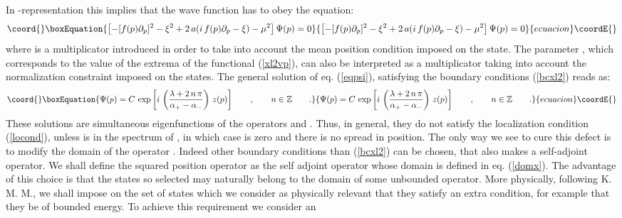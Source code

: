 \documentclass[a4paper,10pt]{article}
\providecommand{\x}{\mbox{\rm{\bf \^ x}}}
\providecommand{\xl}{\x_{\lambda}}
\providecommand{\cD}{{\cal D}}
\providecommand{\ZZ}{\mathbb Z}
\begin{document}
In \coordHE{}-representation this implies that the wave function
\coordHE{} has to obey the equation:
\begin{equation}\coord{}\boxEquation{
\left[-[f(p)\partial_p]^2-\xi^2+2\,a(i\,f(p)\partial_p-\xi)-\mu^2\right]\Psi(p)=0\label{eqpsi}
}{
\left[-[f(p)\partial_p]^2-\xi^2+2\,a(i\,f(p)\partial_p-\xi)-\mu^2\right]\Psi(p)=0}{ecuacion}\coordE{}\end{equation} where \coordHE{} is a multiplicator introduced in order to
take into account the mean position condition imposed on the
state. The parameter \coordHE{}, which corresponds to the value of
the extrema of the functional (\ref{xl2vp}), can also be
interpreted as a multiplicator taking into account the
normalization constraint imposed on the states. The general
solution of eq. (\ref{eqpsi}), satisfying the boundary conditions
(\ref{bcxl2}) reads as:
\begin{equation}\coord{}\boxEquation{
\Psi(p)=C\,\exp\left[i\,\left(\frac{\lambda+2\,n\,\pi}{\alpha_+-\alpha_-}\right)
\,z(p)\right] \qquad,\qquad n\in\ZZ\qquad .
}{
\Psi(p)=C\,\exp\left[i\,\left(\frac{\lambda+2\,n\,\pi}{\alpha_+-\alpha_-}\right)
\,z(p)\right] \qquad,\qquad n\in\ZZ\qquad .
}{ecuacion}\coordE{}\end{equation} These solutions are simultaneous eigenfunctions of the
operators \myHighlight{$\xl$}\coordHE{} and \myHighlight{$\xl^2$}\coordHE{}. Thus, in general, they do not satisfy
the localization condition (\ref{locond}), unless \myHighlight{$\xi$}\coordHE{} is in the
spectrum of \myHighlight{$\xl$}\coordHE{}, in which case \coordHE{} is zero and there is no
spread in position. The only way we see to cure this defect is to
modify the domain of the operator \myHighlight{$\x^2$}\coordHE{}. Indeed other boundary
conditions than (\ref{bcxl2}) can be chosen, that also makes
\coordHE{} a self-adjoint operator. We shall define the
squared position operator as the self adjoint operator \cite{RiNa}
\coordHE{} whose domain is \myHighlight{$\cD(\hat x)$}\coordHE{} defined in
eq. (\ref{domx}). The advantage of this choice is that the states
so selected may naturally belong to the domain of some unbounded
operator. More physically, following K. M. M., we shall impose on
the set of states which we consider as physically relevant that
they satisfy an extra condition, for example that they be of
bounded energy. To achieve this requirement we consider an
\end{document}

